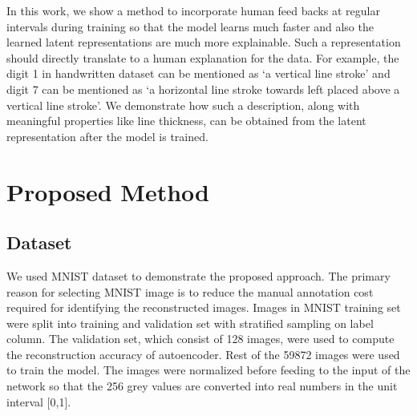 \documentclass[journal]{IEEEtran}
\begin{document}
  In this work, we show a method to incorporate human feed backs at regular intervals during training so that the model learns much faster and also the learned latent representations are much more explainable. Such a representation should directly translate to a human explanation for the data. For example, the digit 1 in  handwritten dataset  can be mentioned as  `a vertical line stroke'  and digit 7 can be mentioned as `a horizontal line stroke towards left placed  above a vertical line stroke'. We demonstrate how  such a description, along with meaningful properties like line thickness, can be obtained from the latent representation after the model is trained.
 
\section{Proposed Method} \label{proposed_method}
\subsection{Dataset}
We used MNIST dataset\cite{mnist} to demonstrate the proposed approach. The primary reason for selecting MNIST image is to reduce the manual annotation cost required for identifying the reconstructed images. Images in MNIST training set were split into training and validation set with stratified sampling on label column. The validation set, which consist of 128 images, were used to compute the reconstruction accuracy of autoencoder. Rest of the 59872 images were used to train the model. The images were normalized  before feeding to the input of the network so that the 256 grey values are converted into real numbers in the unit interval [0,1].
\end{document}
